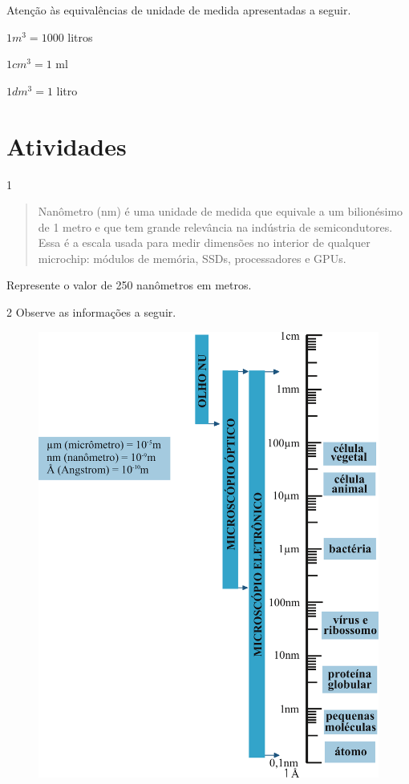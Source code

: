 {Atenção às equivalências de unidade de medida apresentadas a seguir.

$1 m^3 = 1000$ litros

$1 cm^3 = 1$ ml

$1 dm^3 = 1$ litro
}

\section{Atividades}

\num{1} 

\begin{quote}
Nanômetro (nm) é uma unidade de medida que equivale a um bilionésimo
de 1 metro e que tem grande relevância na indústria de semicondutores.
Essa é a escala usada para medir dimensões no interior de qualquer
microchip: módulos de memória, SSDs, processadores e GPUs.

\end{quote}

Represente o valor de 250 nanômetros em metros.

\begin{emptybox}
\end{emptybox}

\num{2} Observe as informações a seguir.

\begin{figure}[htpb!]
\centering
\includegraphics[width=.58\textwidth]{./ilustras-mat/modulo_14-atividade_2.png}
\end{figure}


